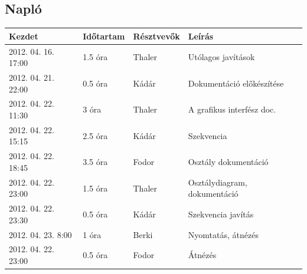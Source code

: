 		\subsection{Napló}
    \begin{center} 
        \begin{tabular}{| l | p{1.9cm} | p{2.6cm} | p{6.1cm} |}
            \hline
                Kezdet & Időtartam & Résztvevők & Leírás \\
            \hline \hline 
2012. 04. 16. 17:00 & 1.5 óra & Thaler & Utólagos javítások\\ \hline
2012. 04. 21. 22:00 & 0.5 óra & Kádár & Dokumentáció előkészítése\\ \hline
2012. 04. 22. 11:30 & 3 óra & Thaler & A grafikus interfész doc.\\ \hline
2012. 04. 22. 15:15 & 2.5 óra & Kádár & Szekvencia\\ \hline
2012. 04. 22. 18:45 & 3.5 óra & Fodor & Osztály dokumentáció\\ \hline
2012. 04. 22. 23:00 & 1.5 óra & Thaler & Osztálydiagram, dokumentáció\\ \hline
2012. 04. 22. 23:30 & 0.5 óra & Kádár & Szekvencia javítás\\ \hline
2012. 04. 23. 8:00 & 1 óra & Berki & Nyomtatás, átnézés\\ \hline
2012. 04. 22. 23:00 & 0.5 óra & Fodor & Átnézés\\ \hline

            \hline
        \end{tabular}
    \end{center}

